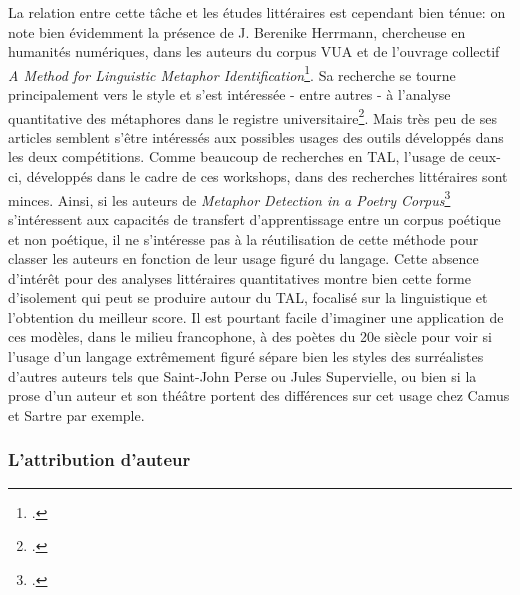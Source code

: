 La relation entre cette tâche et les études littéraires est cependant bien ténue: on note bien évidemment la présence de J. Berenike Herrmann, chercheuse en humanités numériques, dans les auteurs du corpus VUA et de l'ouvrage collectif \textit{A Method for Linguistic Metaphor Identification}\footcite{steen_method_2010}. Sa recherche se tourne principalement vers le style et s'est intéressée - entre autres - à l'analyse quantitative des métaphores dans le registre universitaire\footcite{herrmann_high_2015}. Mais très peu de ses articles semblent s'être intéressés aux possibles usages des outils développés dans les deux compétitions. Comme beaucoup de recherches en TAL, l'usage de ceux-ci, développés dans le cadre de ces workshops, dans des recherches littéraires sont minces. Ainsi, si les auteurs de \textit{Metaphor Detection in a Poetry Corpus}\footcite{kesarwani_metaphor_2017} s'intéressent aux capacités de transfert d'apprentissage entre un corpus poétique et non poétique, il ne s'intéresse pas à la réutilisation de cette méthode pour classer les auteurs en fonction de leur usage figuré du langage. Cette absence d'intérêt pour des analyses littéraires quantitatives montre bien cette forme d'isolement qui peut se produire autour du TAL, focalisé sur la linguistique et l'obtention du meilleur score. Il est pourtant facile d'imaginer une application de ces modèles, dans le milieu francophone, à des poètes du 20e siècle pour voir si l'usage d'un langage extrêmement figuré sépare bien les styles des surréalistes d'autres auteurs tels que Saint-John Perse ou Jules Supervielle, ou bien si la prose d'un auteur et son théâtre portent des différences sur cet usage chez Camus et Sartre par exemple.

\subsubsection{L'attribution d'auteur}

